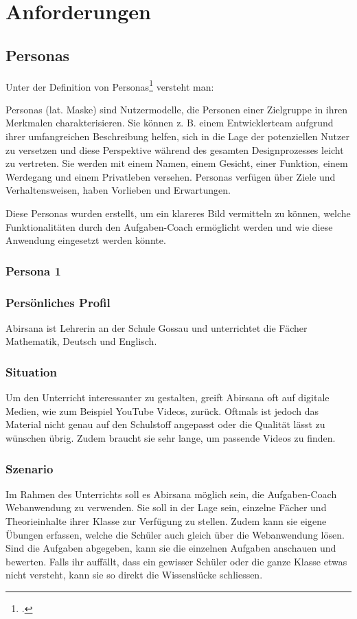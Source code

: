 \section{Anforderungen}

\subsection{Personas}
Unter der Definition von Personas\footcite{persona_definition} versteht man: 
\begin{displayquote}
Personas (lat. Maske) sind Nutzermodelle, die Personen einer Zielgruppe in ihren Merkmalen charakterisieren. Sie können z. B. einem Entwicklerteam aufgrund ihrer umfangreichen Beschreibung helfen, sich in die Lage der potenziellen Nutzer zu versetzen und diese Perspektive während des gesamten Designprozesses leicht zu vertreten. Sie werden mit einem Namen, einem Gesicht, einer Funktion, einem Werdegang und einem Privatleben versehen. Personas verfügen über Ziele und Verhaltensweisen, haben Vorlieben und Erwartungen.
\end{displayquote}

Diese Personas wurden erstellt, um ein klareres Bild vermitteln zu können, welche Funktionalitäten durch den Aufgaben-Coach ermöglicht werden und wie diese Anwendung eingesetzt werden könnte.

\subsubsection{Persona 1}
\subsubsection*{Persönliches Profil}
Abirsana ist Lehrerin an der Schule Gossau und unterrichtet die Fächer Mathematik, Deutsch und Englisch.

\subsubsection*{Situation}
Um den Unterricht interessanter zu gestalten, greift Abirsana oft auf digitale Medien, wie zum Beispiel YouTube Videos, zurück. Oftmals ist jedoch das Material nicht genau auf den Schulstoff angepasst oder die Qualität lässt zu wünschen übrig. Zudem braucht sie sehr lange, um passende Videos zu finden.

\subsubsection*{Szenario}
Im Rahmen des Unterrichts soll es Abirsana möglich sein, die Aufgaben-Coach Webanwendung zu verwenden. Sie soll in der Lage sein, einzelne Fächer und Theorieinhalte ihrer Klasse zur Verfügung zu stellen. Zudem kann sie eigene Übungen erfassen, welche die Schüler auch gleich über die Webanwendung lösen. Sind die Aufgaben abgegeben, kann sie die einzelnen Aufgaben anschauen und bewerten. Falls ihr auffällt, dass ein gewisser Schüler oder die ganze Klasse etwas nicht versteht, kann sie so direkt die Wissenslücke schliessen.

